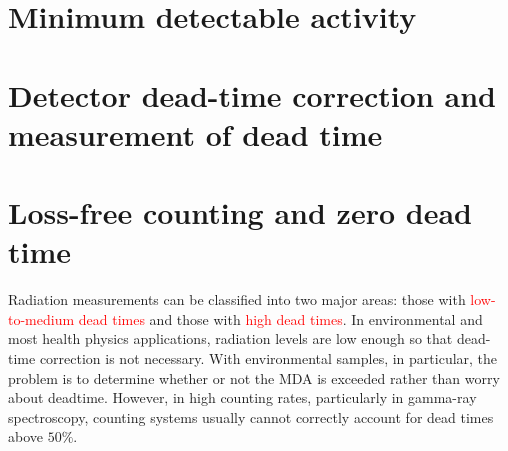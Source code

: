 \documentclass[12pt,a4paper]{article}
\begin{document}
\section{Minimum detectable activity}
































\section{Detector dead-time correction and measurement of dead time}



















































\section{Loss-free counting and zero dead time}
Radiation measurements can be classified into two major areas: those with \textcolor{red}{low-to-medium dead times} and those with \textcolor{red}{high dead times}. In environmental and most health physics applications, radiation levels are low enough so that dead-time correction is not necessary. With environmental samples, in particular, the problem is to determine whether or not the MDA is exceeded rather than worry about deadtime. However, in high counting rates, particularly in gamma-ray spectroscopy, counting systems usually cannot correctly account for dead times above $50\%$. 
\end{document}
